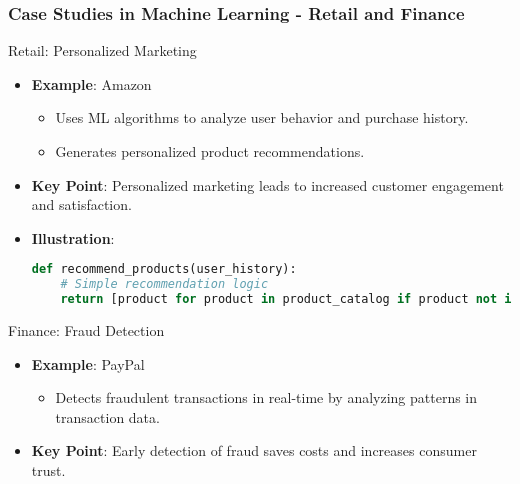 \documentclass[aspectratio=169]{beamer}
\begin{document}
\begin{frame}[fragile]
    \frametitle{Case Studies in Machine Learning - Retail and Finance}
    \begin{block}{Retail: Personalized Marketing}
        \begin{itemize}
            \item \textbf{Example}: Amazon
            \begin{itemize}
                \item Uses ML algorithms to analyze user behavior and purchase history.
                \item Generates personalized product recommendations.
            \end{itemize}
            \item \textbf{Key Point}: Personalized marketing leads to increased customer engagement and satisfaction.
            \item \textbf{Illustration}: 
            \begin{lstlisting}[language=python]
def recommend_products(user_history):
    # Simple recommendation logic
    return [product for product in product_catalog if product not in user_history]
            \end{lstlisting}
        \end{itemize}
    \end{block}

    \begin{block}{Finance: Fraud Detection}
        \begin{itemize}
            \item \textbf{Example}: PayPal
            \begin{itemize}
                \item Detects fraudulent transactions in real-time by analyzing patterns in transaction data.
            \end{itemize}
            \item \textbf{Key Point}: Early detection of fraud saves costs and increases consumer trust.
        \end{itemize}
    \end{block}
\end{frame}
\end{document}
